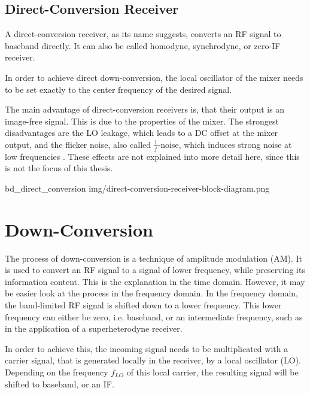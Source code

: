 \subsection{Direct-Conversion Receiver}

A direct-conversion receiver, as its name suggests, converts an RF signal to baseband directly.
It can also be called homodyne, synchrodyne, or zero-IF receiver.

In order to achieve direct down-conversion, the local oscillator of the mixer needs to be set exactly to the center frequency of the desired signal.

The main advantage of direct-conversion receivers is, that their output is an image-free signal.
This is due to the properties of the mixer.
The strongest disadvantages are the LO leakage, which leads to a DC offset at the mixer output, and the flicker noise, also called $\frac{1}{f}$-noise, which induces strong noise at low frequencies \cite{PassosFábio2020AHSo}.
These effects are not explained into more detail here, since this is not the focus of this thesis.

 {bd_direct_conversion} {img/direct-conversion-receiver-block-diagram.png}


\section{Down-Conversion}

The process of down-conversion is a technique of amplitude modulation (AM).
It is used to convert an RF signal to a signal of lower frequency, while preserving its information content.
This is the explanation in the time domain.
However, it may be easier look at the process in the frequency domain.
In the frequency domain, the band-limited RF signal is shifted down to a lower frequency.
This lower frequency can either be zero, i.e. baseband, or an intermediate frequency, such as in the application of a superheterodyne receiver.

In order to achieve this, the incoming signal needs to be multiplicated with a carrier signal, that is generated locally in the receiver, by a local oscillator (LO).
Depending on the frequency $f_{LO}$ of this local carrier, the resulting signal will be shifted to baseband, or an IF.

